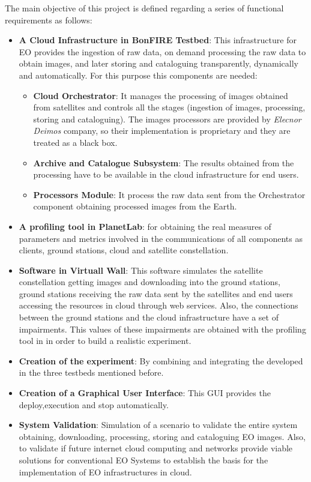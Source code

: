 The main objective of this project is defined regarding a series of functional
requirements as follows:
\begin{itemize}
  
\item {\textbf{A Cloud Infrastructure in BonFIRE Testbed}: This
  infrastructure for \ac{EO} provides the ingestion of raw data, on demand processing the raw
  data to obtain images, and later storing and cataloguing transparently,
  dynamically and automatically. For this purpose this components are needed:
}
\begin{itemize}

\item{\textbf{Cloud Orchestrator}: It manages the
  processing of images obtained from satellites and controls all the stages
  (ingestion of images, processing, storing and cataloguing). The images
  processors are provided by \emph{Elecnor Deimos} company, so their implementation is proprietary and they are treated as a black box.}
\item {\textbf{Archive and Catalogue Subsystem}: The
  results obtained from the processing have to be available in the cloud
  infrastructure for end users.}
\item{\textbf{Processors Module}: It process the raw data sent from
  the Orchestrator component obtaining processed images from the Earth.}  
\end{itemize}
\item {\textbf{A profiling tool in PlanetLab}: for obtaining the real measures of
  parameters and metrics involved in the communications of all components as
  clients, ground stations, cloud and satellite constellation.}


\item {\textbf{Software in Virtuall Wall}: This software simulates the satellite
  constellation getting images and downloading into the ground stations, ground
  stations receiving the raw data sent by the satellites and end users
  accessing the resources in cloud through web services. Also, the connections
  between the ground stations and the cloud infrastructure have a set of
  impairments. This values of these impairments are obtained with the profiling tool in
  \pl in order to build a  realistic experiment.}

\item {\textbf{Creation of the experiment}: By combining and integrating
  the developed in the three testbeds mentioned before.}

\item {\textbf{Creation of a Graphical User Interface}: This \ac{GUI} provides
  the deploy,execution and stop automatically.} 

\item {\textbf{System Validation}: Simulation of a scenario to validate the
  entire system obtaining, downloading, processing, storing and cataloguing
  \ac{EO} images. Also, to validate if future internet cloud computing
  and networks provide viable solutions for conventional \ac{EO}
  Systems to establish the basis for the implementation of \ac{EO}
  infrastructures in
  cloud. }

\end{itemize}
